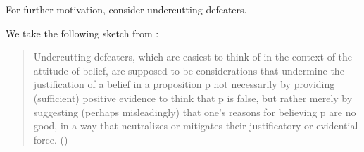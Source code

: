 \begin{note}
  For further motivation, consider undercutting defeaters.

  We take the following sketch from \textcite{Worsnip:2018aa}:
  \begin{quote}
    Undercutting defeaters, which are easiest to think of in the context of the attitude of belief, are supposed to be considerations that undermine the justification of a belief in a proposition p not necessarily by providing (sufficient) positive evidence to think that p is false, but rather merely by suggesting (perhaps misleadingly) that one’s reasons for believing p are no good, in a way that neutralizes or mitigates their justificatory or evidential force.\nolinebreak
    \mbox{}\hfill\mbox{(\citeyear[29]{Worsnip:2018aa})}
  \end{quote}
\end{note}
